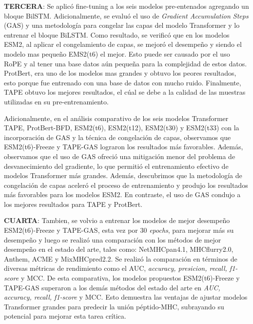 \textbf{TERCERA}: Se aplicó fine-tuning a los seis modelos pre-entenados agregando un bloque BilSTM. Adicionalmente, se evaluó el uso de \textit{Gradient Accumulation Steps} (GAS) y una metodología para congelar las capas del modelo Transformer y lo entrenar el bloque BiLSTM. Como resultado, se verificó que en los modelos ESM2, al aplicar el congelamiento de capas, se mejoró el desempeño y siendo el modelo mas pequeño EMS2(t6) el mejor. Esto puede ser causado por el uso RoPE y al tener una base datos aún pequeña para la complejidad de estos datos. ProtBert, era uno de los modelos mas grandes y obtuvo los peores resultados, esto porque fue entrenado con una base de datos con mucho ruido. Finalmente, TAPE obtuvo los mejores resultados, el cúal se debe a la calidad de las muestras utilizadas en su pre-entrenamiento.


Adicionalmente, en el análisis comparativo de los seis modelos Transformer TAPE, ProtBert-BFD, ESM2(t6), ESM2(t12), ESM2(t30) y ESM2(t33) con la incorporación de GAS y la técnica de congelación de capas, observamos que ESM2(t6)-Freeze y TAPE-GAS lograron los resultados más favorables. Además, observamos que el uso de GAS ofreció una mitigación menor del problema de desvanecimiento del gradiente, lo que permitió el entrenamiento efectivo de modelos Transformer más grandes. Además, descubrimos que la metodología de congelación de capas aceleró el proceso de entrenamiento y produjo los resultados más favorables para los modelos ESM2. En contraste, el uso de GAS condujo a los mejores resultados para TAPE y ProtBert.

\textbf{CUARTA}: Tambien, se volvio a entrenar los modelos de mejor desempeño ESM2(t6)-Freeze y TAPE-GAS, esta vez por 30 \textit{epochs}, para mejorar más su desempeño y luego se realizó una comparación con los métodos de mejor desempeño en el estado del arte, tales como: NetMHCpan4.1, MHCflurry2.0, Anthem, ACME y MixMHCpred2.2. Se realizó la comparación en términos de diversas métricas de rendimiento como el AUC, \textit{accuracy, presicion, recall, f1-score} y MCC. De esta comparativa, los modelos propuestos ESM2(t6)-Freeze y TAPE-GAS superaron a los demás métodos del estado del arte en \textit{AUC, accuracy, recall, f1-score} y MCC. Esto demuestra las ventajas de ajustar modelos Transformer grandes para predecir la unión péptido-MHC, subrayando su potencial para mejorar esta tarea crítica.






